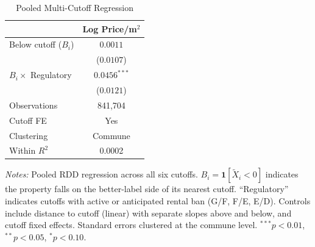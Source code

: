\begin{table}[htbp]
\centering
\caption{Pooled Multi-Cutoff Regression}
\label{tab:pooled}
\begin{tabular}{l c}
\hline\hline
 & Log Price/m$^2$ \\
\hline
Below cutoff ($B_i$) & $0.0011$ \\
 & ($0.0107$) \\
$B_i \times$ Regulatory & $0.0456^{***}$ \\
 & ($0.0121$) \\
\hline
Observations & 841,704 \\
Cutoff FE & Yes \\
Clustering & Commune \\
Within $R^2$ & 0.0002 \\
\hline\hline
\end{tabular}
\begin{minipage}{0.8\textwidth}
\small\textit{Notes:} Pooled RDD regression across all six cutoffs. $B_i = \mathbf{1}[\tilde{X}_i < 0]$ indicates the property falls on the better-label side of its nearest cutoff. ``Regulatory'' indicates cutoffs with active or anticipated rental ban (G/F, F/E, E/D). Controls include distance to cutoff (linear) with separate slopes above and below, and cutoff fixed effects. Standard errors clustered at the commune level. $^{***}p<0.01$, $^{**}p<0.05$, $^{*}p<0.10$.
\end{minipage}
\end{table}
